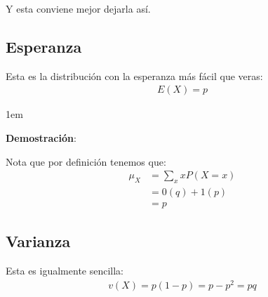 \documentclass[12pt, fleqn]{report}                             %
\newenvironment{SmallIndentation}[1][0.75em]                    %
        {\begin{adjustwidth}{#1}{}\begin{footnotesize}}             %
        {\end{footnotesize}\end{adjustwidth}}                       %
\theoremstyle{break}                                            %
\begin{document}
                Y esta conviene mejor dejarla así.

            \clearpage
            \subsection{Esperanza}

                Esta es la distribución con la esperanza más fácil que veras:
                \begin{align*}
                    E(X) = p
                \end{align*}

                \begin{SmallIndentation}[1em]
                    \textbf{Demostración}:
                    
                    Nota que por definición tenemos que:
                    \begin{align*}
                        \mu_X 
                            &= \sum_x x P(X = x)        \\
                            &= 0(q) + 1(p)              \\
                            &= p
                    \end{align*}
                    
                
                \end{SmallIndentation}


            \vspace{1em}
            \subsection{Varianza}

                Esta es igualmente sencilla:
                \begin{align*}
                    v(X) = p(1-p) = p - p^2 = pq
                \end{align*}
\end{document}
